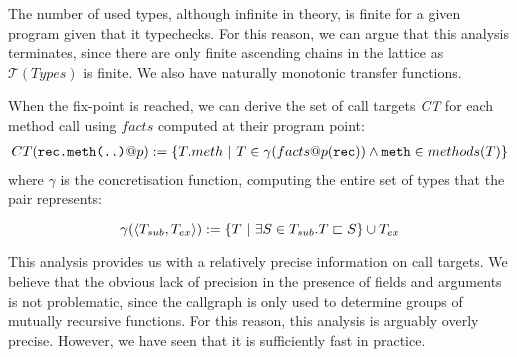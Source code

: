 The number of used types, although infinite in theory, is finite for a given
program given that it typechecks. For this reason, we can argue that this
analysis terminates, since there are only finite ascending chains in the
lattice as $\mathcal{T}(Types)$ is finite. We also have naturally monotonic
transfer functions.

When the fix-point is reached, we can derive the set of call targets \emph{CT}
for each method call using $facts$ computed at their program point:
\begin{eqnarray*}
    CT(\verb/rec.meth(..)/ @ p) := \{ T.meth ~|~ T \in \gamma(facts@p(\verb/rec/)) \land \verb/meth/ \in methods(T) \}
\end{eqnarray*}
where $\gamma$ is the concretisation function, computing the entire set of
types that the pair represents:

$$
\gamma(\langle T_{sub}, T_{ex} \rangle ) := \{ T ~|~ \exists S \in T_{sub}. T \sqsubset S\} \cup T_{ex}
$$

This analysis provides us with a relatively precise information on call
targets. We believe that the obvious lack of precision in the presence of
fields and arguments is not problematic, since the callgraph is only used to
determine groups of mutually recursive functions. For this reason, this
analysis is arguably overly precise. However, we have seen that it is
sufficiently fast in practice.
